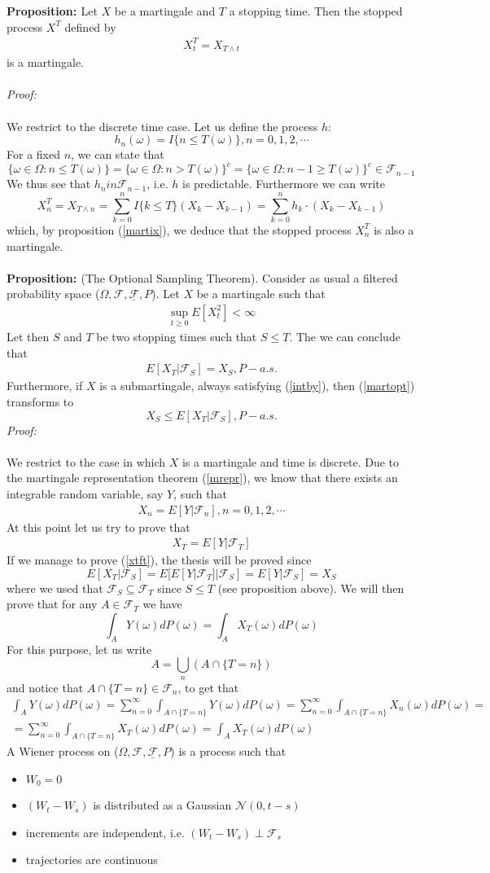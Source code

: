 \documentclass[a4paper,10pt]{report}
\theoremstyle{plain}
\theoremstyle{definition}
\newcommand\be{\begin{eqnarray}}    %
\newcommand\ee{\end{eqnarray}}
\newcommand{\PROP} {{\bf{Proposition: }}}
\newcommand{\PROOF} {{\emph{Proof: \\ \\}}}
\newcommand{\FF} {\mathcal{F} }
\newcommand{\DPO} {dP(\omega) }
\newcommand{\FLT} {\underline{\mathcal{F}}}
\begin{document}
\PROP Let $X$ be a martingale and $T$ a stopping time. Then the stopped process $X^T$ defined by
\be 
X_t^T=X_{T\wedge t}
\label{stoppedmartingale}
\ee
is a martingale. \\ \\
\PROOF We restrict to the discrete time case. Let us define the process $h$:
\[
h_n(\omega)=I\{n\leq T(\omega)\}, n=0,1,2,\cdots
\]
For a fixed $n$, we can state that 
\[
\{\omega\in \Omega: n\leq T(\omega)\}=\{\omega\in \Omega: n> T(\omega)\}^c=\{\omega\in \Omega: n-1\geq T(\omega)\}^c\in \FF_{n-1}
\]
We thus see that $h_n	in \FF_{n-1}$, i.e. $h$ is predictable. Furthermore we can write
\[
X_n^T=X_{T\wedge n}=\sum_{k=0}^n I\{k\leq T\}(X_k-X_{k-1})=\sum_{k=0}^n h_k\cdot (X_k-X_{k-1})
\]
which, by proposition (\ref{martix}), we deduce that the stopped process $X_n^T$ is also a martingale. \\ \\
\PROP (The Optional Sampling Theorem). Consider as usual a filtered probability space ($\Omega, \FF, \FLT, P$). Let $X$ be a martingale such that 
\be
\sup_{t\geq 0} E[X_t^2]<\infty
\label{intby}
\ee
Let then $S$ and $T$ be two stopping times such that $S\leq T$. The we can conclude that 
\be 
E[X_T|\FF_S]=X_S, P-a.s.
\label{martopt}
\ee
Furthermore, if $X$ is a submartingale, always satisfying (\ref{intby}), then (\ref{martopt}) transforms to 
\[
X_S \leq E[X_T|\FF_S], P-a.s.
\]
\PROOF
We restrict to the case in which $X$ is a martingale and time is discrete. Due to the martingale representation theorem (\ref{mrepr}), we know that there exists an integrable random variable, say $Y$, such that 
\be
X_n=E[Y|\FF_n], n=0,1,2,\cdots 
\ee
At this point let us try to prove that 
\be
X_T=E[Y|\FF_T] 
\label{xtft}
\ee
If we manage to prove (\ref{xtft}), the thesis will be proved since 
\[
E[X_T|\FF_S]=E[E[Y|\FF_T]|\FF_S]=E[Y|\FF_S]=X_S
\]
where we used that $\FF_S\subseteq \FF_T$ since $S\leq T$ (see proposition above).
We will then prove that for any $A\in \FF_T$ we have
\[
\int_A Y(\omega)\DPO=\int_A X_T(\omega)\DPO
\]
For this purpose, let us write
\[
A=\bigcup_{n}(A\cap \{T=n\})
\]
and notice that $A\cap \{T=n\}\in \FF_n$, to get that
\be 
\int_A Y(\omega)\DPO=\sum_{n=0}^\infty \int_{A\cap \{T=n\}}Y(\omega)\DPO
=\sum_{n=0}^\infty \int_{A\cap \{T=n\}}X_n(\omega)\DPO= \\
=\sum_{n=0}^\infty \int_{A\cap \{T=n\}}X_T(\omega)\DPO=\int_A X_T(\omega)\DPO
\ee
A Wiener process on ($\Omega, \FF, \FLT, P$) is a process such that
\begin{itemize}
\item $W_0=0$
\item $(W_t-W_s)$ is distributed as a Gaussian $\mathcal{N}(0, t-s)$
\item increments are independent, i.e. $(W_t-W_s) \perp \FF_s$
\item trajectories are continuous
\end{itemize}
\end{document}
